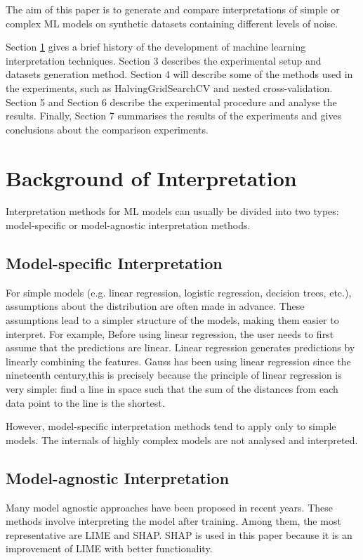 \documentclass[runningheads,a4paper]{llncs}
\begin{document}
The aim of this paper is to generate and compare interpretations of simple or complex ML models on synthetic datasets containing different levels of noise.

Section \ref{section background} gives a brief history of the development of machine learning interpretation techniques. 
Section 3 describes the experimental setup and datasets generation method. 
Section 4 will describe some of the methods used in the experiments, such as HalvingGridSearchCV and nested cross-validation.
Section 5 and Section 6 describe the experimental procedure and analyse the results. 
Finally, Section 7 summarises the results of the experiments and gives conclusions about the comparison experiments.

\section{Background of Interpretation}\label{section background}

Interpretation methods for ML models can usually be divided into two types: model-specific or model-agnostic interpretation methods\cite{doshivelez2017rigorous}.

\subsection{Model-specific Interpretation}

For simple models (e.g. linear regression, logistic regression, decision trees, etc.), assumptions about the distribution  are often made in advance\cite{doshivelez2017rigorous}.
These assumptions lead to a simpler structure of the models, making them easier to interpret.
For example, Before using linear regression, the user needs to first assume that the predictions are linear.
Linear regression generates predictions by linearly combining the features.
Gauss has been using linear regression since the nineteenth century\cite{gauss1877theoria},this is precisely because the principle of linear regression is very simple: find a line in space such that the sum of the distances from each data point to the line is the shortest.

However, model-specific interpretation methods tend to apply only to simple models. The internals of highly complex models are not analysed and interpreted.

\subsection{Model-agnostic Interpretation}
Many model agnostic approaches have been proposed in recent years. 
These methods involve interpreting the model after training.
Among them, the most representative are LIME and SHAP.
SHAP is used in this paper because it is an improvement of LIME with better functionality\cite{alvarezmelis2018robustness}.
\end{document}
